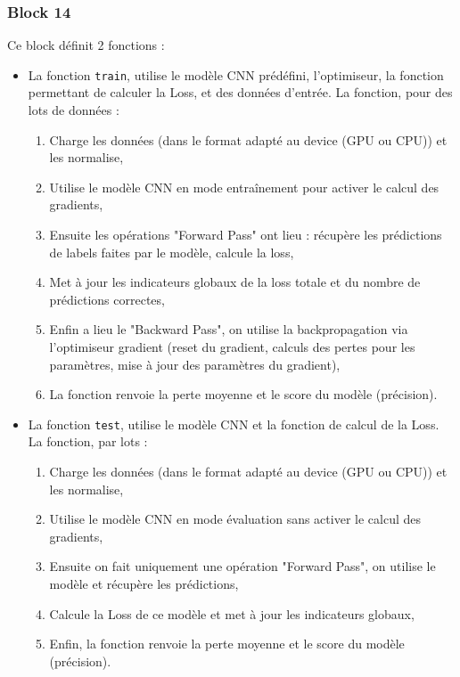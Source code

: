 \documentclass{article}
\begin{document}
\subsubsection{Block 14}
Ce block définit 2 fonctions :
\begin{itemize}
    \item La fonction \texttt{train}, utilise le modèle CNN prédéfini, l'optimiseur, la fonction permettant de calculer la Loss, et des données d'entrée.
    La fonction, pour des lots de données :
    \begin{enumerate}
        \item Charge les données (dans le format adapté au device (GPU ou CPU)) et les normalise,
        \item Utilise le modèle CNN en mode entraînement pour activer le calcul des gradients,
        \item Ensuite les opérations "Forward Pass" ont lieu : récupère les prédictions de labels faites par le modèle, calcule la loss,
        \item Met à jour les indicateurs globaux de la loss totale et du nombre de prédictions correctes,
        \item Enfin a lieu le "Backward Pass", on utilise la backpropagation via l'optimiseur gradient (reset du gradient, calculs des pertes pour les paramètres, mise à jour des paramètres du gradient),
        \item La fonction renvoie la perte moyenne et le score du modèle (précision).
    \end{enumerate}
    
    \item La fonction \texttt{test}, utilise le modèle CNN et la fonction de calcul de la Loss.
    La fonction, par lots :
    \begin{enumerate}
        \item Charge les données (dans le format adapté au device (GPU ou CPU)) et les normalise,
        \item Utilise le modèle CNN en mode évaluation sans activer le calcul des gradients,
        \item Ensuite on fait uniquement une opération "Forward Pass", on utilise le modèle et récupère les prédictions,
        \item Calcule la Loss de ce modèle et met à jour les indicateurs globaux,
        \item Enfin, la fonction renvoie la perte moyenne et le score du modèle (précision).
    \end{enumerate}
\end{itemize}
\end{document}
